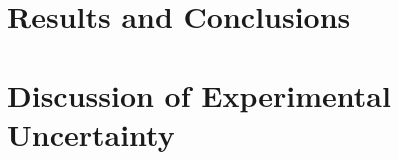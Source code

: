 \documentclass{article}
\begin{document}

\section{Results and Conclusions}





\section{Discussion of Experimental Uncertainty}
\end{document}

